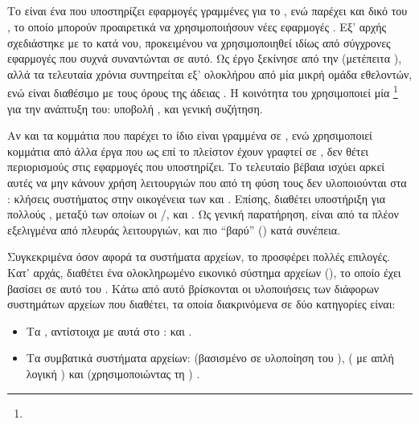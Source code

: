 \subsection{\osv{}}
Το \osv{} είναι ένα  που υποστηρίζει εφαρμογές γραμμένες
για το \linux{}, ενώ παρέχει και δικό του , το οποίο μπορούν
προαιρετικά να χρησιμοποιήσουν νέες εφαρμογές \cite{osv}. Εξ' αρχής σχεδιάστηκε
με το  κατά νου, προκειμένου να χρησιμοποιηθεί ιδίως από σύγχρονες
εφαρμογές που συχνά συναντώνται σε αυτό. Ως έργο ξεκίνησε από την  (μετέπειτα ), αλλά τα τελευταία χρόνια συντηρείται εξ'
ολοκλήρου από μία μικρή ομάδα εθελοντών, ενώ είναι διαθέσιμο με τους όρους της
άδειας . Η κοινότητα του χρησιμοποιεί μία %
\footnote{}
για την ανάπτυξη του: υποβολή ,  και γενική
συζήτηση.

Αν και τα κομμάτια που παρέχει το ίδιο είναι γραμμένα σε , ενώ
χρησιμοποιεί κομμάτια από άλλα έργα που ως επί το πλείστον έχουν γραφτεί σε
, δεν θέτει περιορισμούς στις εφαρμογές που υποστηρίζει. Το
τελευταίο βέβαια ισχύει αρκεί αυτές να μην κάνουν χρήση λειτουργιών που από τη
φύση τους δεν υλοποιούνται στα : κλήσεις συστήματος στην
οικογένεια των \texttt{} και \texttt{}. Επίσης, διαθέτει
υποστήριξη για πολλούς , μεταξύ των οποίων οι \qemu{}/,
 και  \cite{firecracker}.
Ως γενική παρατήρηση, είναι από τα πλέον εξελιγμένα  από πλευράς
λειτουργιών, και πιο ``βαρύ'' () κατά συνέπεια.

Συγκεκριμένα όσον αφορά τα συστήματα αρχείων, το \osv{} προσφέρει πολλές
επιλογές. Κατ' αρχάς, διαθέτει ένα ολοκληρωμένο εικονικό σύστημα αρχείων
(), το οποίο έχει βασίσει σε αυτό του 
\cite{prex}.
Κάτω από αυτό βρίσκονται οι υλοποιήσεις των διάφορων συστημάτων αρχείων που
διαθέτει, τα οποία διακρινόμενα σε δύο κατηγορίες είναι:
\begin{itemize}
    \item Τα , αντίστοιχα με αυτά στο \linux{}:
         και .
    \item Τα συμβατικά συστήματα αρχείων:  (βασισμένο σε υλοποίηση του
        ),  ( με απλή
        λογική ) και  (χρησιμοποιώντας τη )
        \cite{libnfs}.
\end{itemize}

